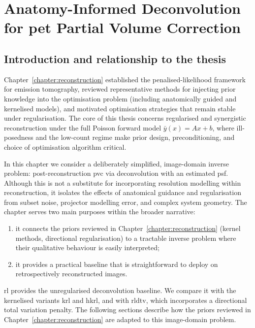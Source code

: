 \chapter{Anatomy-Informed Deconvolution for \gls{pet} Partial Volume Correction}
\label{chapter:deconvolution_pvc}

\section{Introduction and relationship to the thesis}
\label{sec:deconv_intro}

Chapter~\ref{chapter:reconstruction} established the penalised-likelihood framework for emission tomography, reviewed representative methods for injecting prior knowledge into the optimisation problem (including anatomically guided and kernelised models), and motivated optimisation strategies that remain stable under regularisation. The core of this thesis concerns regularised and synergistic reconstruction under the full Poisson forward model $\bar y(x)=Ax+b$, where ill-posedness and the low-count regime make prior design, preconditioning, and choice of optimisation algorithm critical.

In this chapter we consider a deliberately simplified, image-domain inverse problem: post-reconstruction \acrfull{pvc} \cite{marquisAddressingPartialVolume2025} via deconvolution with an estimated \acrfull{psf}. Although this is not a substitute for incorporating resolution modelling within reconstruction, it isolates the effects of anatomical guidance and regularisation from subset noise, projector modelling error, and complex system geometry. The chapter serves two main purposes within the broader narrative:
\begin{enumerate}
    \item it connects the priors reviewed in Chapter~\ref{chapter:reconstruction} (kernel methods, directional regularisation) to a tractable inverse problem where their qualitative behaviour is easily interpreted;
    \item it provides a practical  baseline that is straightforward to deploy on retrospectively reconstructed images.
\end{enumerate}

\acrfull{rl} provides the unregularised deconvolution baseline. We compare it with the kernelised variants \gls{krl} and \gls{hkrl}, and with \gls{rldtv}, which incorporates a directional total variation penalty. The following sections describe how the priors reviewed in Chapter~\ref{chapter:reconstruction} are adapted to this image-domain problem.

